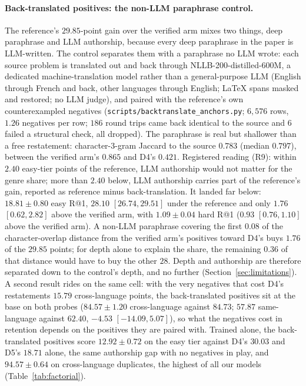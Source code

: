 \paragraph{Back-translated positives: the non-LLM paraphrase control.}
The reference's $29.85$-point gain over the verified arm mixes two things, deep paraphrase and LLM authorship, because every deep paraphrase in the paper is LLM-written. The control separates them with a paraphrase no LLM wrote: each source problem is translated out and back through NLLB-200-distilled-600M, a dedicated machine-translation model rather than a general-purpose LLM (English through French and back, other languages through English; LaTeX spans masked and restored; no LLM judge), and paired with the reference's own counterexampled negatives (\texttt{scripts/backtranslate\_anchors.py}; $6{,}576$ rows, $1.26$ negatives per row; $186$ round trips came back identical to the source and $6$ failed a structural check, all dropped). The paraphrase is real but shallower than a free restatement: character-$3$-gram Jaccard to the source $0.783$ (median $0.797$), between the verified arm's $0.865$ and D4's $0.421$. Registered reading (R9): within $2.40$ easy-tier points of the reference, LLM authorship would not matter for the genre share; more than $2.40$ below, LLM authorship carries part of the reference's gain, reported as reference minus back-translation. It landed far below: $18.81 \pm 0.80$ easy R@1, $28.10$ $[26.74, 29.51]$ under the reference and only $1.76$ $[0.62, 2.82]$ above the verified arm, with $1.09 \pm 0.04$ hard R@1 ($0.93$ $[0.76, 1.10]$ above the verified arm). A non-LLM paraphrase covering the first $0.08$ of the character-overlap distance from the verified arm's positives toward D4's buys $1.76$ of the $29.85$ points; for depth alone to explain the share, the remaining $0.36$ of that distance would have to buy the other $28$. Depth and authorship are therefore separated down to the control's depth, and no further (Section~\ref{sec:limitations}). A second result rides on the same cell: with the very negatives that cost D4's restatements $15.79$ cross-language points, the back-translated positives sit at the base on both probes ($84.57 \pm 1.20$ cross-language against $84.73$; $57.87$ same-language against $62.40$, $-4.53$ $[-14.09, 5.07]$), so what the negatives cost in retention depends on the positives they are paired with. Trained alone, the back-translated positives score $12.92 \pm 0.72$ on the easy tier against D4's $30.03$ and D5's $18.71$ alone, the same authorship gap with no negatives in play, and $94.57 \pm 0.64$ on cross-language duplicates, the highest of all our models (Table~\ref{tab:factorial}).

